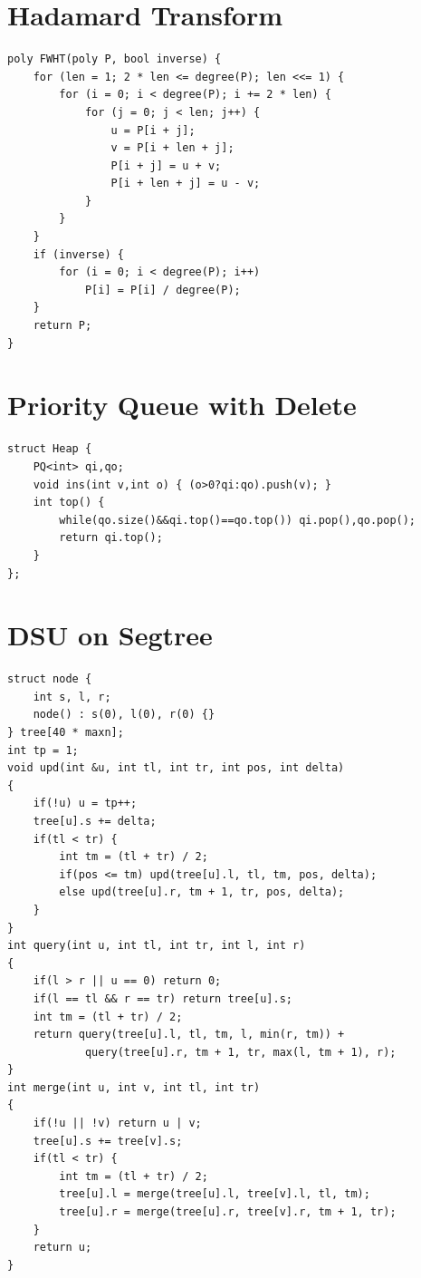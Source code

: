 \documentclass[a4paper,landscape]{article}
\begin{document}
\begin{multicols}{2}
\begin{lstlisting}
\end{lstlisting}

\section{Hadamard Transform}
\begin{lstlisting}
poly FWHT(poly P, bool inverse) {
    for (len = 1; 2 * len <= degree(P); len <<= 1) {
        for (i = 0; i < degree(P); i += 2 * len) {
            for (j = 0; j < len; j++) {
                u = P[i + j];
                v = P[i + len + j];
                P[i + j] = u + v;
                P[i + len + j] = u - v;
            }
        }
    }
    if (inverse) {
        for (i = 0; i < degree(P); i++)
            P[i] = P[i] / degree(P);
    }
    return P;
}
\end{lstlisting}

\section{Priority Queue with Delete}
\begin{lstlisting}
struct Heap {
	PQ<int> qi,qo;
	void ins(int v,int o) { (o>0?qi:qo).push(v); }
	int top() {
		while(qo.size()&&qi.top()==qo.top()) qi.pop(),qo.pop();
		return qi.top();
	}
};
\end{lstlisting}

\section{DSU on Segtree}
\begin{lstlisting}
struct node {
	int s, l, r;
	node() : s(0), l(0), r(0) {}
} tree[40 * maxn];
int tp = 1;
void upd(int &u, int tl, int tr, int pos, int delta) 
{
	if(!u) u = tp++;
	tree[u].s += delta;
	if(tl < tr) {
		int tm = (tl + tr) / 2;
		if(pos <= tm) upd(tree[u].l, tl, tm, pos, delta);
		else upd(tree[u].r, tm + 1, tr, pos, delta);
	}
}
int query(int u, int tl, int tr, int l, int r)
{
	if(l > r || u == 0) return 0;
	if(l == tl && r == tr) return tree[u].s;
	int tm = (tl + tr) / 2;
	return query(tree[u].l, tl, tm, l, min(r, tm)) +
			query(tree[u].r, tm + 1, tr, max(l, tm + 1), r);
}
int merge(int u, int v, int tl, int tr)
{
	if(!u || !v) return u | v;
	tree[u].s += tree[v].s;
	if(tl < tr) {
		int tm = (tl + tr) / 2;
		tree[u].l = merge(tree[u].l, tree[v].l, tl, tm);
		tree[u].r = merge(tree[u].r, tree[v].r, tm + 1, tr);
	}
	return u;
}
\end{lstlisting}


\end{multicols}
\end{document}
